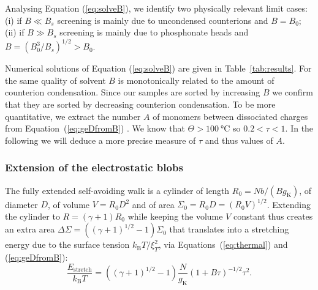 \documentclass[journal=jacsat,manuscript=article]{achemso}
\begin{document}
Analysing Equation (\ref{eq:solveB}), we identify two physically relevant limit cases: (i) if $B \ll B_s$ screening is mainly due to uncondensed counterions and $B = B_0$; (ii) if $B \gg B_s$ screening is mainly due to phosphonate heads and $B = \left(B_0^3/B_s\right)^{1/2} > B_0$.

Numerical solutions of Equation (\ref{eq:solveB}) are given in Table~\ref{tab:results}. For the same quality of solvent $B$ is monotonically related to the amount of counterion condensation. Since our samples are sorted by increasing $B$ we confirm that they are sorted by decreasing counterion condensation. To be more quantitative, we extract the number $A$ of monomers between dissociated charges from Equation~(\ref{eq:geDfromB})%
.
%
We know that $\Theta>\SI{100}{\celsius}$ so $0.2<\tau<1$. In the following we will deduce a more precise measure of $\tau$ and thus values of $A$.


%

\subsubsection{Extension of the electrostatic blobs}

The fully extended self-avoiding walk is a cylinder of length $R_0 = Nb/(Bg_\mathrm{K})$, of diameter $D$, of volume $V = R_0 D^2$ and of area $\Sigma_0 = R_0 D = (R_0 V)^{1/2}$. Extending the cylinder to $R = (\gamma+1) R_0$ while keeping the volume $V$ constant thus creates an extra area 
$
\Delta\Sigma = \left(\left(\gamma +1\right)^{1/2} -1\right) \Sigma_0
$
that translates into a stretching energy due to the surface tension $k_\mathrm{B}T/\xi_T^2$, via Equations~(\ref{eq:thermal}) and (\ref{eq:geDfromB}):
\begin{equation}
\frac{E_\mathrm{stretch}}{k_\mathrm{B}T} = \left(\left(\gamma +1\right)^{1/2} -1\right) \frac{N}{g_\mathrm{K}} (1+B\tau)^{-1/2} \tau^2.
\label{eq:stretch}
\end{equation}
\end{document}

